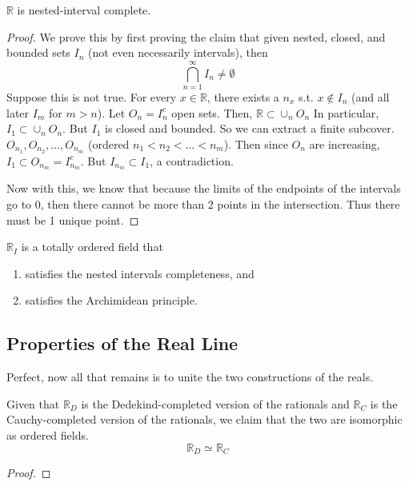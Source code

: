   \begin{theorem}
    $\mathbb{R}$ is nested-interval complete. 
  \end{theorem}
  \begin{proof}
    We prove this by first proving the claim that given nested, closed, and bounded sets $I_n$ (not even necessarily intervals), then 
    \begin{equation}
      \bigcap_{n=1}^\infty I_n \neq \emptyset
    \end{equation}
    Suppose this is not true. For every $x \in \mathbb{R}$, there exists a $n_x$ s.t. $x \not\in I_n$ (and all later $I_m$ for $m > n$). Let $O_n = I_n^c$ open sets. Then, $\mathbb{R} \subset \cup_n O_n$ In particular, $I_1 \subset \cup_n O_n$. But $I_1$ is closed and bounded. So we can extract a finite subcover. $O_{n_1}, O_{n_2}, \ldots, O_{n_m}$ (ordered $n_1 < n_2 < \ldots< n_m$). Then since $O_n$ are increasing, $I_1 \subset O_{n_m} = I_{n_m}^c$. But $I_{n_m} \subset I_1$, a contradiction. 

    Now with this, we know that because the limits of the endpoints of the intervals go to $0$, then there cannot be more than 2 points in the intersection. Thus there must be 1 unique point. 
  \end{proof} 

  \begin{definition}
    $\mathbb{R}_I$ is a totally ordered field that 
    \begin{enumerate}
      \item satisfies the nested intervals completeness, and 
      \item satisfies the Archimidean principle.
    \end{enumerate}
  \end{definition}

\subsection{Properties of the Real Line}  

  Perfect, now all that remains is to unite the two constructions of the reals. 

  \begin{theorem}
    Given that $\mathbb{R}_D$ is the Dedekind-completed version of the rationals and $\mathbb{R}_C$ is the Cauchy-completed version of the rationals, we claim that the two are isomorphic as ordered fields. 
    \begin{equation}
      \mathbb{R}_D \simeq \mathbb{R}_C
    \end{equation}
  \end{theorem}
  \begin{proof}
    
  \end{proof}

